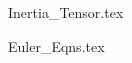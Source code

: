\documentclass[a4paper, 12pt]{report}
\begin{document}
\begin{center}
\begin{comment}
\end{comment}
{Inertia_Tensor.tex}
\begin{comment}
Start Level: Sections
End Level: Sections
Aditional Comments:
Kinematic Transport Theorem
\end{comment}
{Euler_Eqns.tex}
\begin{comment}
Start Level: Sections
End Level: Sections
Aditional Comments:
Kinematic Transport Theorem
\end{comment}
\end{center}
\end{document}
